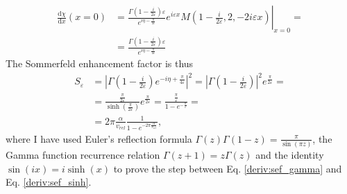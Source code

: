 \begin{align}
	\frac{\mathrm{d}\chi }{\mathrm{d}x} (x=0) &=
	\left.
		\frac{\Gamma \left( 1- \frac{i}{2\varepsilon } \right) \varepsilon }{e^{i \eta -\frac{\pi}{4\varepsilon }}} e^{i\varepsilon x} M\left(1-\frac{i}{2\varepsilon },2,-2 i \varepsilon x\right)
	\right\vert _{x=0}= \\
	&= \frac{\Gamma \left( 1- \frac{i}{2\varepsilon }\right) \varepsilon }{e^{i \eta - \frac{\pi}{4\varepsilon }}}
\end{align}
The Sommerfeld enhancement factor is thus
\begin{align}
	S_{\varepsilon } &= \left\vert \Gamma \left(1-\frac{i}{2\varepsilon }\right) e^{-i \eta + \frac{\pi}{4\varepsilon }} \right\vert ^2=\left\vert \Gamma \left(1-\frac{i}{2\varepsilon }\right)\right\vert ^2 e^{\frac{\pi}{2\varepsilon }}=\label{deriv:sef_gamma}\\
	&= \frac{\frac{\pi}{2\varepsilon }}{\sinh \left( \frac{\pi }{2 \varepsilon } \right)}e^{\frac{\pi}{2\varepsilon }} = \frac{\frac{\pi}{\varepsilon }}{1- e^{-\frac{\pi}{\varepsilon }}}=\label{deriv:sef_sinh}\\
	&= 2\pi \frac{\alpha}{v_{rel} } \frac{1}{1- e^{-2\pi \frac{\alpha}{v_{rel} }}}\label{deriv:result},
\end{align}
where I have used Euler's reflection formula \(\Gamma (z) \Gamma (1-z) = \frac{\pi}{\sin(\pi z)}\), the Gamma function recurrence relation \(\Gamma (z+1)=z \Gamma (z)\) and the identity \(\sin (ix)=i \sinh (x)\) to prove the step between Eq. \eqref{deriv:sef_gamma} and Eq. \eqref{deriv:sef_sinh}.